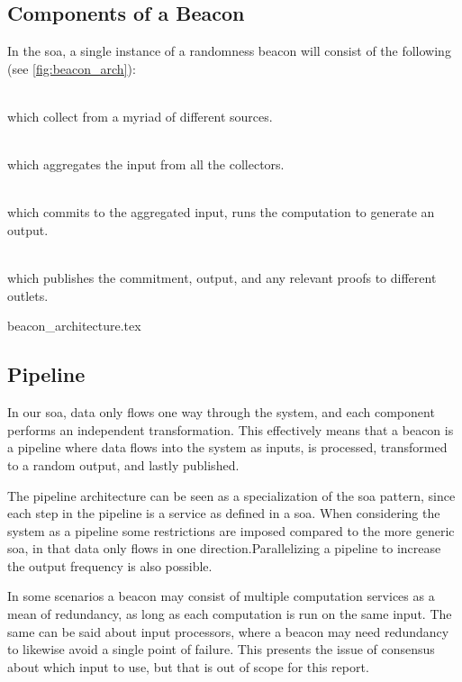 \subsection{Components of a Beacon}
\label{sub:components_of_a_beacon}
In the \gls{soa}, a single instance of a randomness beacon will consist of the following (see \cref{fig:beacon_arch}):
\begin{description}
    \setlength\itemsep{0em}
    \item[Input Collector Services]\hfill \\ which collect from a myriad of different sources.
    \item[Input Processing Service]\hfill \\ which aggregates the input from all the collectors.
    \item[Computation Service]\hfill \\ which commits to the aggregated input, runs the computation to generate an output.
    \item[Publishing Services]\hfill \\ which publishes the commitment, output, and any relevant proofs to different outlets.
\end{description}

{beacon_architecture.tex}

\subsection{Pipeline}%
\label{sub:pipeline}
In our \gls{soa}, data only flows one way through the system, and each component performs an independent transformation.
This effectively means that a beacon is a pipeline where data flows into the system as inputs, is processed, transformed to a random output, and lastly published.

The pipeline architecture can be seen as a specialization of the \gls{soa} pattern, since each step in the pipeline is a service as defined in a \gls{soa}.
When considering the system as a pipeline some restrictions are imposed compared to the more generic \gls{soa}, in that data only flows in one direction.Parallelizing a pipeline to increase the output frequency is also possible.

In some scenarios a beacon may consist of multiple computation services as a mean of redundancy, as long as each computation is run on the same input.
The same can be said about input processors, where a beacon may need redundancy to likewise avoid a single point of failure.
This presents the issue of consensus about which input to use, but that is out of scope for this report.

